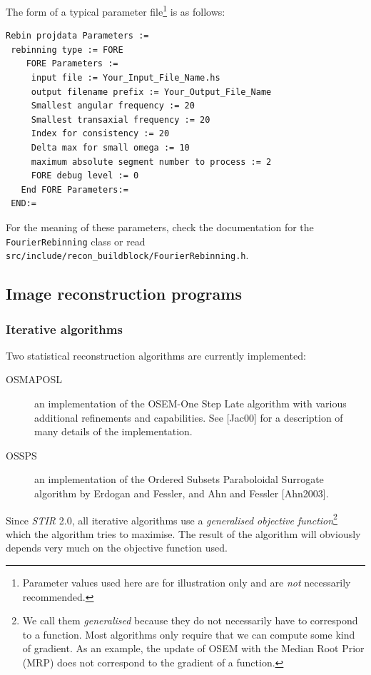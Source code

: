 \documentclass{article}
\begin{document}
The form of a typical parameter file\footnote{Parameter values used here are for
illustration only and are \textit{not} necessarily recommended.} is as follows:

{\small 
\begin{verbatim}
Rebin projdata Parameters :=
 rebinning type := FORE
    FORE Parameters :=
     input file := Your_Input_File_Name.hs
     output filename prefix := Your_Output_File_Name
     Smallest angular frequency := 20
     Smallest transaxial frequency := 20
     Index for consistency := 20
     Delta max for small omega := 10
     maximum absolute segment number to process := 2
     FORE debug level := 0
   End FORE Parameters:=
 END:=
\end{verbatim}
}
For the meaning of these parameters, check the documentation for the
\texttt{FourierRebinning} class or read
\texttt{src/include/recon\_buildblock/FourierRebinning.h}.

\subsection{
Image reconstruction programs}
\label{sec:imagereconstructionprograms}



\subsubsection{
Iterative algorithms}

Two statistical reconstruction algorithms are currently implemented:
\begin{description}
\item[OSMAPOSL] an implementation 
of the OSEM-One Step Late algorithm with various additional refinements 
and capabilities. See [Jac00] for a description of many details of the
implementation.
\item[OSSPS] an implementation of the Ordered Subsets Paraboloidal
Surrogate algorithm by Erdogan and Fessler, and Ahn and Fessler [Ahn2003]. 
\end{description}

Since \textit{STIR} 2.0, all iterative algorithms use a \textit{generalised objective 
function}\footnote{We call them \textit{generalised} because they do not
necessarily have to correspond to a function. Most algorithms only require
that we can compute some kind of gradient. As an example, the update
of OSEM with the Median Root Prior (MRP) does not correspond to the
gradient of a function.} which the algorithm tries to maximise. The result
of the algorithm will obviously depends very much on the objective function
used.
\end{document}
